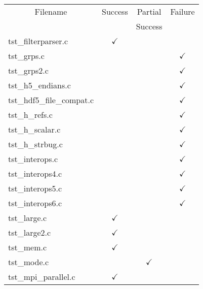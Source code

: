 \begin{table}[H]
\centering
\begin{tabular}{|l|c|c|c|}
\hline
\multicolumn{1}{|c|}{\parbox{8cm}{\centering Filename}} & \multicolumn{1}{c|}{Success} & \multicolumn{1}{c|}{Partial} & \multicolumn{1}{c|}{Failure} \\
                        &               & Success       &               \\ \hline \hline
tst\_filterparser.c     & $\checkmark$  &               &               \\ \hline
tst\_grps.c             &               &               & $\checkmark$  \\ \hline
tst\_grps2.c            &               &               & $\checkmark$  \\ \hline
tst\_h5\_endians.c      &               &               & $\checkmark$  \\ \hline
tst\_hdf5\_file\_compat.c   &           &               & $\checkmark$  \\ \hline
tst\_h\_refs.c          &               &               & $\checkmark$  \\ \hline
tst\_h\_scalar.c        &               &               & $\checkmark$  \\ \hline
tst\_h\_strbug.c        &               &               & $\checkmark$  \\ \hline
tst\_interops.c         &               &               & $\checkmark$  \\ \hline
tst\_interops4.c        &               &               & $\checkmark$  \\ \hline
tst\_interops5.c        &               &               & $\checkmark$  \\ \hline
tst\_interops6.c        &               &               & $\checkmark$  \\ \hline
tst\_large.c            & $\checkmark$  &               &               \\ \hline
tst\_large2.c           & $\checkmark$  &               &               \\ \hline
tst\_mem.c              & $\checkmark$  &               &               \\ \hline
tst\_mode.c             &               & $\checkmark$  &               \\ \hline
tst\_mpi\_parallel.c    & $\checkmark$  &               &               \\ \hline

\end{tabular}
\end{table}
